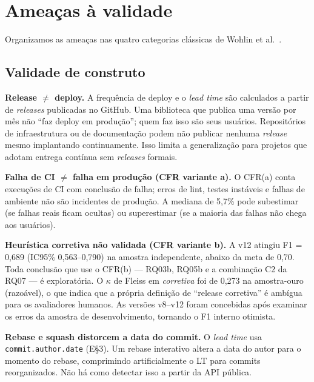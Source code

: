 
\section{Ameaças à validade}

Organizamos as ameaças nas quatro categorias clássicas de Wohlin et al.~\cite{wohlin2012experimentation}.

\subsection{Validade de construto}

\textbf{Release $\neq$ deploy.} A frequência de deploy e o \textit{lead time} são calculados a
partir de \textit{releases} publicadas no GitHub. Uma biblioteca que publica uma versão por mês
não ``faz deploy em produção''; quem faz isso são seus usuários. Repositórios de
infraestrutura ou de documentação podem não publicar nenhuma \textit{release} mesmo implantando
continuamente. Isso limita a generalização para projetos que adotam entrega contínua sem
\textit{releases} formais.

\textbf{Falha de CI $\neq$ falha em produção (CFR variante a).} O CFR(a) conta execuções de
CI com conclusão de falha; erros de lint, testes instáveis e falhas de ambiente não são
incidentes de produção. A mediana de 5,7\% pode subestimar (se falhas reais ficam ocultas)
ou superestimar (se a maioria das falhas não chega aos usuários).

\textbf{Heurística corretiva não validada (CFR variante b).} A v12 atingiu F1 = 0,689
(IC95\% 0,563--0,790) na amostra independente, abaixo da meta de 0,70. Toda conclusão
que use o CFR(b) — RQ03b, RQ05b e a combinação C2 da RQ07 — é exploratória. O $\kappa$
de Fleiss em \textit{corretiva} foi de 0,273 na amostra-ouro (razoável), o que indica que
a própria definição de ``release corretiva'' é ambígua para os avaliadores humanos.
As versões v8--v12 foram concebidas após examinar os erros da amostra de desenvolvimento,
tornando o F1 interno otimista.

\textbf{Rebase e squash distorcem a data do commit.} O \textit{lead time} usa
\texttt{commit.author.date} (E§3). Um rebase interativo altera a data do autor para o
momento do rebase, comprimindo artificialmente o LT para commits reorganizados. Não há
como detectar isso a partir da API pública.

